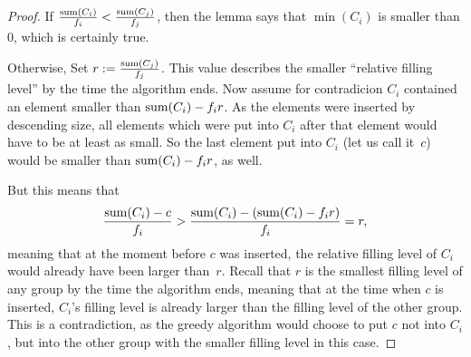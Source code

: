 \documentclass[a4paper,style=print,bibliography=totoc,nexus,lnum,extramargin]{tubsbook}
\begin{document}
\begin{proof}
    If $\frac{\operatorname{sum}(C_i)}{f_i} < \frac{\operatorname{sum}(C_j)}{f_j}$, then the lemma says that $\min(C_i)$ is smaller than 0, which is certainly true.

    Otherwise, Set $r := \frac{\operatorname{sum}(C_j)}{f_j}$. This value describes the smaller “relative filling level” by the time the algorithm ends.
    Now assume for contradicion $C_i$ contained an element smaller than $\operatorname{sum}(C_i) - f_i r$. As the elements were inserted by descending size, all elements which were put into $C_i$ after that element would have to be at least as small. So the last element put into $C_i$ (let us call it~$c$) would be smaller than $\operatorname{sum}(C_i) - f_i r$, as well.

    But this means that $$\frac{\operatorname{sum}(C_i) - c}{f_i} > \frac{\operatorname{sum}(C_i) - (\operatorname{sum}(C_i) - f_i r)}{f_i} = r,$$ meaning that at the moment before $c$ was inserted, the relative filling level of $C_i$ would already have been larger than~$r$.
    Recall that $r$ is the smallest filling level of any group by the time the algorithm ends, meaning that at the time when $c$ is inserted, $C_i$'s filling level is already larger than the filling level of the other group.
    This is a contradiction, as the greedy algorithm would choose to put $c$ not into $C_i$, but into the other group with the smaller filling level in this case.
\end{proof}
\end{document}
